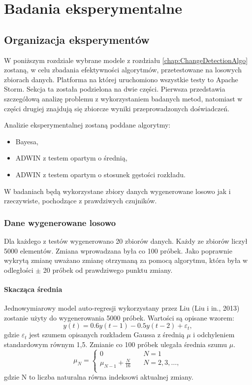 \chapter{Badania eksperymentalne}
\section{Organizacja eksperymentów}
W poniższym rozdziale wybrane modele z rozdziału \ref{chap:ChangeDetectionAlgo} zostaną,
w celu zbadania efektywności algorytmów,
przetestowane na losowych zbiorach danych.
Platforma na której uruchomiono wszystkie testy to Apache Storm.
Sekcja ta została podzielona na dwie części.
Pierwsza przedstawia szczegółową analizę problemu z wykorzystaniem badanych metod,
natomiast w części drugiej znajdują się zbiorcze wyniki przeprowadzonych doświadczeń.

Analizie eksperymentalnej zostaną poddane algorytmy:
\begin{itemize}
  \item Bayesa,
  \item ADWIN z testem opartym o średnią,
  \item ADWIN z testem opartym o stosunek gęstości rozkładu.
\end{itemize}

W badaniach będą wykorzystane zbiory danych wygenerowane losowo jak i rzeczywiste,
pochodzące z prawdziwych czujników.
\subsection*{Dane wygenerowane losowo}
Dla każdego z testów wygenerowano 20 zbiorów danych.
Każdy ze zbiorów liczył 5000 elementów.
Zmiana wprowadzana była co 100 próbek.
Jako poprawnie wykrytą zmianę uważano zmianę otrzymaną za pomocą algorytmu,
która była w odległości $\pm$ 20 próbek od prawdziwego punktu zmiany.

\subsubsection*{Skacząca średnia}
Jednowymiarowy model auto-regresji wykorzystany przez Liu (Liu i in., 2013)
zostanie użyty do wygenerowania 5000 próbek.
Wartości są opisane wzorem:
$$y(t) = 0.6y(t-1) - 0.5y(t-2) + \varepsilon_t,$$
gdzie $\varepsilon_t$ jest szumem opisanych rozkładem Gaussa z średnią $\mu$
i odchyleniem standardowym równym 1,5.
Zmianie co 100 próbek ulegała średnia szumu $\mu$.
\[ \mu_N =
  \begin{cases}
    0       & \quad N = 1\\
    \mu_{N-1} + \frac{N}{16} & \quad N = 2,3, \ldots, \\
  \end{cases}
\]
gdzie N to liczba naturalna równa indeksowi aktualnej zmiany.
